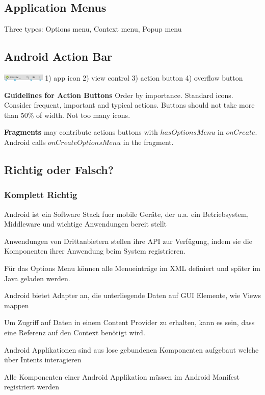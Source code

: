 \subsection{Application Menus}
Three types: Options menu, Context menu, Popup menu

\subsection{Android Action Bar}
\includegraphics[width=0.15\textwidth]{android/actionbar.png}
1) app icon
2) view control
3) action button
4) overflow button

\textbf{Guidelines for Action Buttons}
Order by importance. Standard icons. Consider frequent, important and typical
actions. Buttons should not take more than 50\% of width. Not too many icons.

\textbf{Fragments} may contribute actions buttons with $hasOptionsMenu$ in
$onCreate$. Android calls $onCreateOptionsMenu$ in the fragment.

\subsection{Richtig oder Falsch?}
\subsubsection{Komplett Richtig}
Android ist ein Software Stack fuer mobile Geräte, der u.a. ein Betriebsystem,
Middleware und wichtige Anwendungen bereit stellt

Anwendungen von Drittanbietern stellen ihre API zur Verfügung, indem sie die
Komponenten ihrer Anwendung beim System registrieren.

Für das Options Menu können alle Menueinträge im XML definiert und später im
Java geladen werden.

Android bietet Adapter an, die unterliegende Daten auf GUI Elemente, wie Views
mappen

Um Zugriff auf Daten in einem Content Provider zu erhalten, kann es sein, dass
eine Referenz auf den Context benötigt wird.

Android Applikationen sind aus lose gebundenen Komponenten
aufgebaut welche über Intents interagieren

Alle Komponenten einer Android Applikation müssen im Android
Manifest registriert werden


